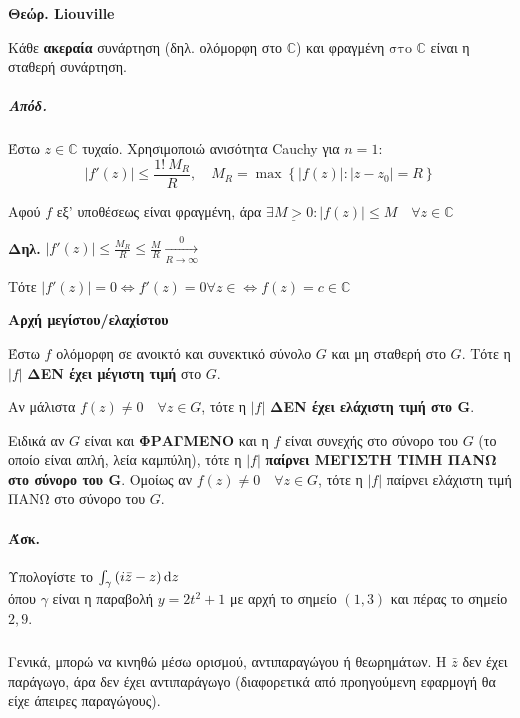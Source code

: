 \documentclass[12pt,a4paper,notitlepage,fleqn]{article}
\begin{document}
\begin{enumparen}
    	\item \textbf{Θεώρ. Liouville}

    	Κάθε \textbf{ακεραία} συνάρτηση (δηλ. ολόμορφη στο \( \mathbb C  \)) και φραγμένη
    	\( \boxed{\text{στο } \mathbb C}  \) είναι η σταθερή συνάρτηση.
    	\subparagraph{Απόδ.}
    	Έστω \( z \in \mathbb C  \) τυχαίο. Χρησιμοποιώ ανισότητα Cauchy για \( n=1 \):
    	\[
    	\left|f'(z)\right| \leq \frac{1!\ M_R}{R},\quad M_R = \max
    	\left\lbrace \left|f(z)\right|: |z-z_0|=R \right\rbrace
    	\]

    	Αφού \( f \) εξ' υποθέσεως είναι φραγμένη, άρα \( \exists \underline{M > 0}:
    	\left|f(z)\right| \leq M \quad \forall z \in \mathbb C
    	 \)

    	\textbf{Δηλ.} \(  \displaystyle
    	\left|f'(z)\right| \leq \frac{M_R}{R} \leq \frac{M}{R}
    	\xrightarrow[R\to \infty] 0
    	 \)

        Τότε \( \left|f'(z)\right| = 0 \iff f'(z)=0 \forall z\in
        \iff f(z) = c\in\mathbb C
        \)

        \item \textbf{Αρχή μεγίστου/ελαχίστου}

        Έστω \( f \) ολόμορφη σε ανοικτό και συνεκτικό σύνολο \( G \) και μη σταθερή στο
        \( G \). Τότε η \( |f| \) \textbf{ΔΕΝ έχει μέγιστη τιμή} στο \( G \).

        Αν μάλιστα \( f(z) \neq 0 \quad \forall z \in G \), τότε η \( |f| \)
        \textbf{ΔΕΝ έχει ελάχιστη τιμή στο \( \mathbf G \)}.

        Ειδικά αν \( G \) είναι και \textbf{ΦΡΑΓΜΕΝΟ} και η \( f \) είναι συνεχής στο
        σύνορο του \( G \) (το οποίο είναι απλή, λεία καμπύλη), τότε η \( |f| \)
        \textbf{παίρνει ΜΕΓΙΣΤΗ ΤΙΜΗ ΠΑΝΩ στο σύνορο του \( \mathbf G \)}.
        Ομοίως αν \( f(z) \neq 0 \quad \forall z \in G \), τότε η \( |f| \)
        παίρνει ελάχιστη τιμή ΠΑΝΩ στο σύνορο του \( G \).

    \end{enumparen}

    \paragraph{Άσκ.} Υπολογίστε το \( \int_\gamma \left( i\bar z - z \right)\mathop{}\!\mathrm{d} z \)
    \\ όπου \( \gamma \) είναι η παραβολή \( y=2t^2+1 \) με αρχή το σημείο \( (1,3) \)
    και πέρας το σημείο \( 2,9 \).
    \subparagraph{}
    Γενικά, μπορώ να κινηθώ μέσω ορισμού, αντιπαραγώγου ή θεωρημάτων. Η \( \bar z \)
    δεν έχει παράγωγο, άρα δεν έχει αντιπαράγωγο (διαφορετικά από προηγούμενη εφαρμογή
    θα είχε άπειρες παραγώγους).
\end{document}

